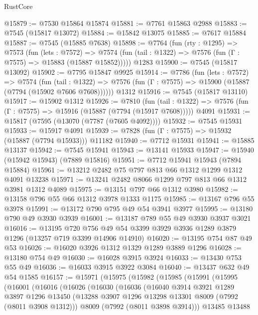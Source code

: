 \begin{lexlean}{RustCore}
\begin{coremodule}
@15879 := @7530 @15864 @15874
@15881 := @7761 @15863 @2988
@15883 := @7545 (@15817 @13072)
@15884 := @15842 @13075
@15885 := @7617 @15884
@15887 := @7545 (@15885 @7638)
@15898 := @7764
    (fun (rty : @1295) =>
    @7573
      (fun (lets : @7572) =>
      @7574 (fun (tail : @1322) => @7576 (fun (Γ : @7575) => @15883 (@15887 @15852)))))
    @1283
@15900 := @7545 (@15817 @13092)
@15902 := @7795 @15847 @9925
@15914 := @7786
    (fun (lets : @7572) =>
    @7574
      (fun (tail : @1322) =>
      @7576 (fun (Γ : @7575) => @15900 (@15887 (@7794 (@15902 @7606 @7608))))))
    @1312
@15916 := @7545 (@15817 @13110)
@15917 := @15902 @1312
@15926 := @7810
    (fun (tail : @1322) => @7576 (fun (Γ : @7575) => @15916 (@15887 (@7794 (@15917 @7608)))))
    @4091
@15931 := @15817 (@7595 (@13070 (@7787 (@7605 @4092))))
@15932 := @7545 @15931
@15933 := @15917 @4091
@15939 := @7828 (fun (Γ : @7575) => @15932 (@15887 (@7794 @15933))) @11182
@15940 := @7712 @15931
@15941 := @15885 @13137
@15942 := @7545 @15941
@15943 := @13141 @15933
@15947 := @15940 (@15942 @15943) (@7889 @15816)
@15951 := @7712 @15941 @15943 (@7894 @15884)
@15961 := @13212 @2482 @75 @797 @813 @66 @1312 @1299 @1312 @4091 @13238
@15971 := @13241 @2482 @8066 @1299 @797 @813 @66 @1312 @3981 @1312 @4089
@15975 := @13151 @797 @66 @1312 @3980
@15982 := @13158 @796 @55 @66 @1312 @3978 @1333 @1175
@15985 := @13167 @796 @55 @3978
@15991 := @13172 @790 @795 @49 @54 @3941 @3977
@15995 := @13180 @790 @49 @3930 @3939
@16001 := @13187 @789 @55 @49 @3930 @3937 @3021
@16016 := @13195
    @720
    @756
    @49
    @54
    @3399
    @3929
    @3936
    @1289
    @3879
    @1296
    (@13257 @719 @3399 @14906 @14910)
@16020 := @13195 @754 @87 @49 @53
@16026 := @16020 @3926 @1312 @1329 @1289 @3889 @1296
@16028 := @13180 @754 @49
@16030 := @16028 @3915 @3924
@16033 := @13430 @753 @55 @49
@16036 := @16033 @3915 @3922 @3084
@16040 := @13437 @632 @49 @54 @1585
@16157 := @15971
    (@15975
      (@15982
        (@15985
          (@15991
            (@15995
              (@16001
                (@16016
                  (@16026
                    (@16030
                      (@16036
                        (@16040
                          @3914
                          @3921
                          @1289
                          @3897
                          @1296
                          @13450
                          (@13288 @3907 @1296 @13298 @13301 @8009 (@7992 (@8011 @3908 @1312)))
                          @8009
                          (@7992 (@8011 @3898 @3914)))
                        @13485
                        @13488

\end{coremodule}
\end{lexlean}
